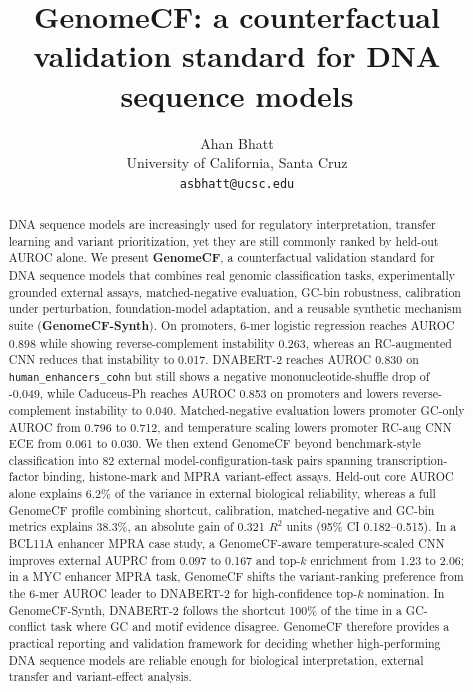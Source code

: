 \documentclass[11pt]{article}
\title{\textbf{GenomeCF: a counterfactual validation standard for DNA sequence models}}
\author{
  Ahan Bhatt \\
  University of California, Santa Cruz \\
  \texttt{asbhatt@ucsc.edu}
}
\date{}
\begin{document}
\maketitle

\begin{abstract}
DNA sequence models are increasingly used for regulatory interpretation, transfer learning and variant prioritization, yet they are still commonly ranked by held-out AUROC alone. We present \textbf{GenomeCF}, a counterfactual validation standard for DNA sequence models that combines real genomic classification tasks, experimentally grounded external assays, matched-negative evaluation, GC-bin robustness, calibration under perturbation, foundation-model adaptation, and a reusable synthetic mechanism suite (\textbf{GenomeCF-Synth}). On promoters, 6-mer logistic regression reaches AUROC 0.898 while showing reverse-complement instability 0.263, whereas an RC-augmented CNN reduces that instability to 0.017. DNABERT-2 reaches AUROC 0.830 on \texttt{human\_enhancers\_cohn} but still shows a negative mononucleotide-shuffle drop of -0.049, while Caduceus-Ph reaches AUROC 0.853 on promoters and lowers reverse-complement instability to 0.040. Matched-negative evaluation lowers promoter GC-only AUROC from 0.796 to 0.712, and temperature scaling lowers promoter RC-aug CNN ECE from 0.061 to 0.030. We then extend GenomeCF beyond benchmark-style classification into 82 external model-configuration-task pairs spanning transcription-factor binding, histone-mark and MPRA variant-effect assays. Held-out core AUROC alone explains 6.2\% of the variance in external biological reliability, whereas a full GenomeCF profile combining shortcut, calibration, matched-negative and GC-bin metrics explains 38.3\%, an absolute gain of 0.321 $R^2$ units (95\% CI 0.182--0.515). In a BCL11A enhancer MPRA case study, a GenomeCF-aware temperature-scaled CNN improves external AUPRC from 0.097 to 0.167 and top-$k$ enrichment from 1.23 to 2.06; in a MYC enhancer MPRA task, GenomeCF shifts the variant-ranking preference from the 6-mer AUROC leader to DNABERT-2 for high-confidence top-$k$ nomination. In GenomeCF-Synth, DNABERT-2 follows the shortcut 100\% of the time in a GC-conflict task where GC and motif evidence disagree. GenomeCF therefore provides a practical reporting and validation framework for deciding whether high-performing DNA sequence models are reliable enough for biological interpretation, external transfer and variant-effect analysis.
\end{abstract}
\end{document}
